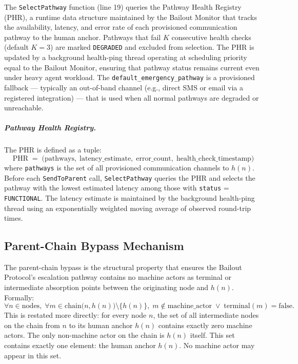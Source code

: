 The \texttt{SelectPathway} function (line 19) queries the Pathway Health Registry (PHR), a runtime data structure maintained by the Bailout Monitor that tracks the availability, latency, and error rate of each provisioned communication pathway to the human anchor. Pathways that fail $K$ consecutive health checks (default $K = 3$) are marked \texttt{DEGRADED} and excluded from selection. The PHR is updated by a background health-ping thread operating at scheduling priority equal to the Bailout Monitor, ensuring that pathway status remains current even under heavy agent workload. The \texttt{default\_emergency\_pathway} is a provisioned fallback — typically an out-of-band channel (e.g., direct SMS or email via a registered integration) — that is used when all normal pathways are degraded or unreachable.

\subparagraph{Pathway Health Registry.} The PHR is defined as a tuple:
\begin{equation}
\text{PHR} \;=\; \bigl(\text{pathways},\; \text{latency\_estimate},\; \text{error\_count},\; \text{health\_check\_timestamp}\bigr)
\end{equation}
where \texttt{pathways} is the set of all provisioned communication channels to $h(n)$. Before each \texttt{SendToParent} call, \texttt{SelectPathway} queries the PHR and selects the pathway with the lowest estimated latency among those with \texttt{status} = \texttt{FUNCTIONAL}. The latency estimate is maintained by the background health-ping thread using an exponentially weighted moving average of observed round-trip times.

\subsection{Parent-Chain Bypass Mechanism}\label{sec:bypass}

The parent-chain bypass is the structural property that ensures the Bailout Protocol's escalation pathway contains no machine actors as terminal or intermediate absorption points between the originating node and $h(n)$. Formally:
\begin{equation}
\forall n \in \text{nodes},\; \forall m \in \text{chain}\bigl(n, h(n)\bigr) \setminus \{h(n)\},\; m \notin \text{machine\_actor} \;\lor\; \text{terminal}(m) = \text{false}. \tag{BYPASS}
\end{equation}
This is restated more directly: for every node $n$, the set of all intermediate nodes on the chain from $n$ to its human anchor $h(n)$ contains exactly zero machine actors. The only non-machine actor on the chain is $h(n)$ itself. This set contains exactly one element: the human anchor $h(n)$. No machine actor may appear in this set.

